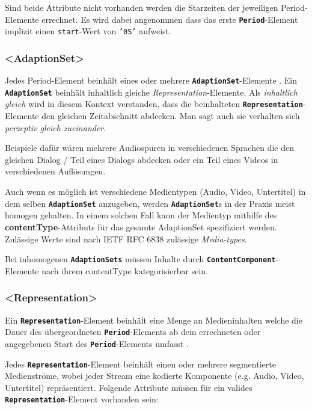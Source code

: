 \documentclass[paper = a4, fontsize = 12pt, parskip = half]{scrartcl} %
\def\attr#1{\texttt{#1}}
\def\elem#1{\texttt{\textbf{#1}}}
\begin{document}
Sind beide Attribute nicht vorhanden werden die Starzeiten der jeweiligen Period-Elemente errechnet. Es wird dabei angenommen dass das erste \elem{Period}-Element implizit einen \attr{start}-Wert von \attr{'0S'} aufweist.

\subsubsection{<AdaptionSet>}
Jedes Period-Element beinhält eines oder mehrere \elem{AdaptionSet}-Elemente \cite{international_organization_for_standardization_isoiec_nodate}. Ein \elem{AdaptionSet} beinhält inhaltlich gleiche \textit{Representation}-Elemente. Als \textit{inhaltlich gleich} wird in diesem Kontext verstanden, dass die beinhalteten \elem{Representation}-Elemente den gleichen Zeitabschnitt abdecken. Man sagt auch sie verhalten sich \textit{perzeptiv gleich zueinander}.

Beispiele dafür wären mehrere Audiospuren in verschiedenen Sprachen die den gleichen Dialog / Teil eines Dialogs abdecken oder ein Teil eines Videos in verschiedenen Auflösungen.

Auch wenn es möglich ist verschiedene Medientypen (Audio, Video, Untertitel) in dem selben \elem{AdaptionSet} anzugeben, werden \elem{AdaptionSet}s in der Praxis meist homogen gehalten. In einem solchen Fall kann der Medientyp mithilfe des \textbf{contentType}-Attributs für das gesamte AdaptionSet spezifiziert werden. Zulässige Werte sind nach IETF RFC 6838 zulässige \textit{Media-types}.

Bei inhomogenen \elem{AdaptionSets} müssen Inhalte durch \elem{ContentComponent}-Elemente nach ihrem contentType kategorisierbar sein.

\subsubsection{<Representation>}
Ein \elem{Representation}-Element beinhält eine Menge an Medieninhalten welche die Dauer des übergeordneten \elem{Period}-Elements ab dem errechneten oder angegebenen Start des \elem{Period}-Elements umfasst \cite{international_organization_for_standardization_isoiec_nodate}.

Jedes \elem{Representation}-Element beinhält einen oder mehrere segmentierte Medienströme, wobei jeder Stream eine kodierte Komponente (e.g. Audio, Video, Untertitel) repräsentiert. Folgende Attribute müssen für ein valides \elem{Representation}-Element vorhanden sein:
\end{document}
